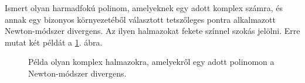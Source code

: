 \documentclass[a4paper,12pt]{report}
\begin{document}
   			Ismert olyan harmadfokú polinom, amelyeknek egy adott komplex számra, és annak egy bizonyos környezetéből választott tetszőleges pontra alkalmazott Newton-módszer divergens. Az ilyen halmazokat fekete színnel szokás jelölni. Erre mutat két példát a \ref{img:div}. ábra.
			\begin{figure}[ht]
				\begin{center}
				\hspace{1cm}
\caption{Példa olyan komplex halmazokra, amelyekről egy adott polinomon a Newton-módszer divergens.} \label{img:div}
				\end{center}
			\end{figure}
\end{document}
